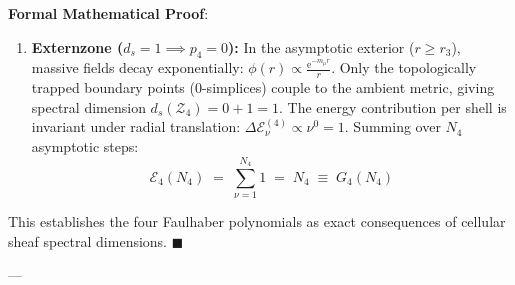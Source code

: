 \documentclass[
    12pt,
    a4paper,
    headings=normal,
    twoside=false,
    open=any,
    parskip=half
]{scrbook}
\newcommand{\eu}{\mathrm{e}}
\newenvironment{myproof}[1][]{%
  \par\vspace{6pt}\noindent\textbf{\sffamily\color{maincolor}Formal Mathematical Proof\ifstrempty{#1}{}{ (#1)}}:\par\nopagebreak
}{%
  \penalty50\hfill\ensuremath{\blacksquare}\par\vspace{6pt}
}
\begin{document}
\begin{myproof}
\begin{enumerate}[label=\textbf{Zone \arabic*:}, leftmargin=2em]
    \item \textbf{Externzone ($d_s = 1 \implies p_4 = 0$):}  
    In the asymptotic exterior ($r \ge r_3$), massive fields decay exponentially: $\phi(r) \propto \frac{\eu^{-m_\mu r}}{r}$. Only the topologically trapped boundary points (0-simplices) couple to the ambient metric, giving spectral dimension $d_s(\mathcal{Z}_4) = 0 + 1 = 1$. 
    The energy contribution per shell is invariant under radial translation: $\Delta\mathcal{E}_\nu^{(4)} \propto \nu^0 = 1$. 
    Summing over $N_4$ asymptotic steps:
    $$\mathcal{E}_4(N_4) \;=\; \sum_{\nu=1}^{N_4} 1 \;=\; N_4 \;\equiv\; G_4(N_4)$$
\end{enumerate}
This establishes the four Faulhaber polynomials as exact consequences of cellular sheaf spectral dimensions.
\end{myproof}

---
\end{document}
